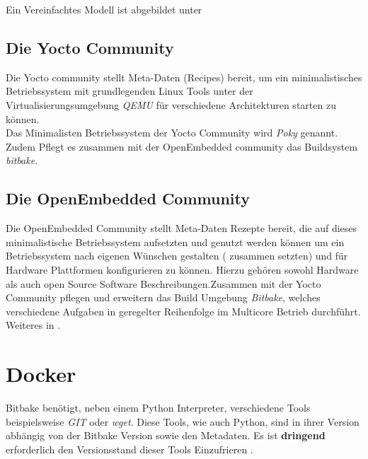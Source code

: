Ein Vereinfachtes Modell ist abgebildet unter
\cite[S.26]{Gonzalez2018:Embedded_Linux_Development_Using_Yocto_Project_Cookbook_2nd}



\subsection{Die Yocto Community}%

Die Yocto community stellt Meta-Daten (Recipes) bereit, um ein minimalistisches
Betriebssystem mit grundlegenden  Linux Tools unter der Virtualisierungsumgebung
\textit{\gls{QEMU}} für verschiedene Architekturen starten zu können.  \\

Das Minimalisten Betriebssystem der Yocto Community wird \textit{\gls{Poky}}
genannt.  \\

Zudem Pflegt es zusammen mit der OpenEmbedded community das Buildsystem
\textit{bitbake}.

\subsection{Die OpenEmbedded Community}%
\label{sub:die_openembedded_community}


Die OpenEmbedded Community stellt Meta-Daten Rezepte bereit, die auf dieses
minimalistische Betriebssystem aufsetzten und genutzt werden können um ein
Betriebssystem nach eigenen Wünschen gestalten ( zusammen setzten) und für
Hardware Plattformen konfigurieren zu können. Hierzu gehören sowohl Hardware als
auch open Source Software Beschreibungen.Zusammen mit der Yocto Community
 pflegen und erweitern das Build Umgebung \textit{Bitbake}, welches
 verschiedene Aufgaben in geregelter Reihenfolge im Multicore Betrieb
 durchführt. Weiteres in .




\section{Docker} \label{sec:docker} Bitbake benötigt, neben einem Python
Interpreter, verschiedene Tools beispielsweise \textit{GIT} oder \textit{wget}.
Diese Tools, wie auch Python, sind in ihrer Version abhängig von der Bitbake
Version sowie den Metadaten. Es ist \textbf{dringend} erforderlich den
Versionsstand dieser Tools \glqq Einzufrieren \grqq. \\



